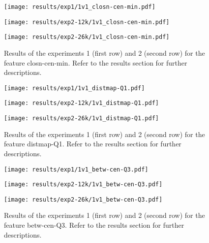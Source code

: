 \begin{figure}[h!]
	\centering
	\begin{minipage}{0.4\linewidth}
		\texttt{[image: results/exp1/1v1\_closn-cen-min.pdf]}
	\end{minipage}
	
	\begin{minipage}{0.4\linewidth}
		\texttt{[image: results/exp2-12k/1v1\_closn-cen-min.pdf]}
	\end{minipage}
	\begin{minipage}{0.4\linewidth}
		\texttt{[image: results/exp2-26k/1v1\_closn-cen-min.pdf]}
	\end{minipage}
	
	\caption[ Results: Feature closn-cen-min]{ Results of the experiments 1 (first row) and 2 (second row) for the feature closn-cen-min. Refer to the results section for further descriptions. }
	\label{fig:appendix_closn-cen-min}
\end{figure}

\begin{figure}[h!]
	\centering
	\begin{minipage}{0.4\linewidth}
		\texttt{[image: results/exp1/1v1\_distmap-Q1.pdf]}
	\end{minipage}
	
	\begin{minipage}{0.4\linewidth}
		\texttt{[image: results/exp2-12k/1v1\_distmap-Q1.pdf]}
	\end{minipage}
	\begin{minipage}{0.4\linewidth}
		\texttt{[image: results/exp2-26k/1v1\_distmap-Q1.pdf]}
	\end{minipage}
	
	\caption[ Results: Feature distmap-Q1]{ Results of the experiments 1 (first row) and 2 (second row) for the feature distmap-Q1. Refer to the results section for further descriptions. }
	\label{fig:appendix_distmap-Q1}
\end{figure}
\newpage 


\begin{figure}[h!]
	\centering
	\begin{minipage}{0.4\linewidth}
		\texttt{[image: results/exp1/1v1\_betw-cen-Q3.pdf]}
	\end{minipage}
	
	\begin{minipage}{0.4\linewidth}
		\texttt{[image: results/exp2-12k/1v1\_betw-cen-Q3.pdf]}
	\end{minipage}
	\begin{minipage}{0.4\linewidth}
		\texttt{[image: results/exp2-26k/1v1\_betw-cen-Q3.pdf]}
	\end{minipage}
	
	\caption[ Results: Feature betw-cen-Q3]{ Results of the experiments 1 (first row) and 2 (second row) for the feature betw-cen-Q3. Refer to the results section for further descriptions. }
	\label{fig:appendix_betw-cen-Q3}
\end{figure}

